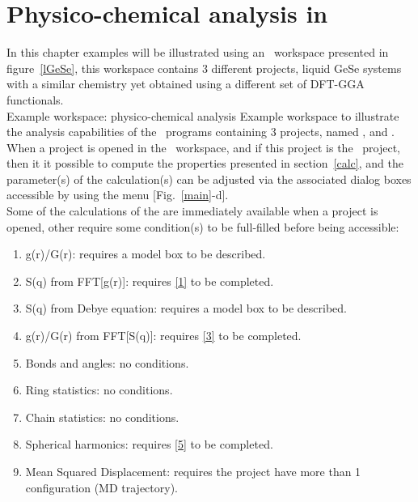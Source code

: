 \chapter{Physico-chemical analysis in \atomes}
\label{ana}

In this chapter examples will be illustrated using an \atomes\ workspace presented in figure~\ref{lGeSe}, this workspace contains 3 different projects, liquid GeSe systems with a similar chemistry yet obtained using a different set of DFT-GGA functionals. \cite{Jcp.138.174505}\\
{Example workspace: physico-chemical analysis}
{Example workspace to illustrate the analysis capabilities of the \atomes\ programs containing 3 projects, named \mbox{},  and .}
\laf When a project is opened in the \atomes\ workspace, and if this project is the \activp\ project, then it it possible to compute the properties presented in section~\ref{calc}, 
and the parameter(s) of the calculation(s) can be adjusted via the associated dialog boxes accessible by using the  menu [Fig.~\ref{main}-d]. \\
Some of the calculations of the  are immediately available when a project is opened, other require some condition(s) to be full-filled before being accessible:
\begin{enumerate}
\item\label{1} g(r)/G(r): requires a model box to be described.
\item\label{2} S(q) from FFT[g(r)]: requires \ref{1} to be completed.
\item\label{3} S(q) from Debye equation: requires a model box to be described.
\item\label{4} g(r)/G(r) from FFT[S(q)]: requires \ref{3} to be completed.
\item\label{5} Bonds and angles: no conditions.
\item\label{6} Ring statistics: no conditions.
\item\label{7} Chain statistics: no conditions.
\item\label{8} Spherical harmonics: requires \ref{5} to be completed.
\item\label{9} Mean Squared Displacement: requires the project have more than 1 configuration (MD trajectory).
\end{enumerate}

